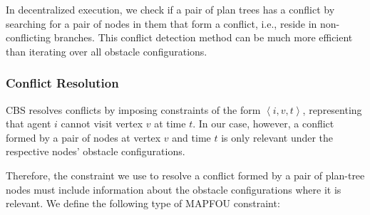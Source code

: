 \documentclass[letterpaper]{article} %
\newcommand{\tuple}[1]{\ensuremath{\left \langle #1 \right \rangle }}
\newcommand{\roni}[1]{{\textcolor{green}{[Roni: #1]}}}
\begin{document}
In decentralized execution, we check if a pair of plan trees has a conflict by searching for a pair of nodes in them that form a conflict, i.e., reside in non-conflicting branches.
This conflict detection method can be much more efficient than iterating over all obstacle configurations.

\subsubsection{Conflict Resolution}
\label{scn:conflicts-resolution}
CBS resolves conflicts by imposing constraints of the form $\tuple{i,v,t}$, representing that agent $i$ cannot visit vertex $v$ at time $t$. In our case, however, a conflict formed by a pair of nodes  at vertex $v$ and time $t$ is only relevant under the respective nodes' obstacle configurations.

Therefore, the constraint we use to resolve a conflict formed by a pair of plan-tree nodes must include  information about the obstacle configurations where it is relevant.
We define the following type of MAPFOU constraint:


\end{document}
